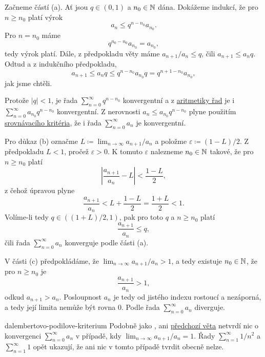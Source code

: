 \begin{thmproof}
 Začneme částí (a). Ať jsou $q \in (0,1)$ a $n_0 \in \mathbb{N}$ dána. Dokážeme indukcí,
 že pro $n \geq n_0$ platí výrok
 \[
  a_n \leq q^{n-n_0}a_{n_0}.
 \]
 Pro $n = n_0$ máme
 \[
  q^{n_0 - n_0}a_{n_0} = a_{n_0},
 \]
 tedy výrok platí. Dále, z předpokladu věty máme $a_{n+1} / a_n \leq q$, čili
 $a_{n+1} \leq a_nq$. Odtud a z indukčního předpokladu,
 \[
  a_{n+1} \leq a_n q \leq q^{n-n_0}a_{n_0}q = q^{n+1-n_0}a_{n_0},
 \]
 jak jsme chtěli.

 Protože $|q|<1$, je řada $\sum_{n = 0}^{\infty} q^{n-n_0}$ konvergentní a z
 \hyperref[prop:aritmetika-ciselnych-rad]{aritmetiky řad} je i $\sum_{n =
 0}^{\infty} a_{n_0}q^{n-n_0}$ konvergentní. Z nerovnosti $a_n \leq
 a_{n_0}q^{n-n_0}$ plyne použitím
 \hyperref[prop:srovnavaci-kriterium]{srovnávacího kritéria}, že i řada $\sum_{n
 = 0}^{\infty} a_n$ je konvergentní.

 Pro důkaz (b) označme $L \coloneqq \lim_{n \to \infty} a_{n+1} / a_n$ a položme
 $\varepsilon \coloneqq (1-L) / 2$. Z předpokladu $L < 1$, pročež
 $\varepsilon>0$. K tomuto $\varepsilon$ nalezneme $n_0 \in \mathbb{N}$ takové, že pro
 $n \geq n_0$ platí
 \[
  \left| \frac{a_{n+1}}{a_n} - L\right| < \frac{1-L}{2},
 \]
 z čehož úpravou plyne
 \[
  \frac{a_{n+1}}{a_n} < L + \frac{1-L}{2} = \frac{1+L}{2} < 1.
 \]
 Volíme-li tedy $q \in ((1+L) / 2,1)$, pak pro toto $q$ a $n \geq n_0$ platí
 \[
  \frac{a_{n+1}}{a_n} \leq q,
 \]
 čili řada $\sum_{n = 0}^{\infty} a_n$ konverguje podle části (a).

 V části (c) předpokládáme, že $\lim_{n \to \infty} a_{n+1} / a_n > 1$, a tedy
 existuje $n_0 \in \mathbb{N}$, že pro $n \geq n_0$ je
 \[
  \frac{a_{n+1}}{a_n} > 1,
 \]
 odkud $a_{n+1} > a_n$. Posloupnost $a_n$ je tedy od jistého indexu rostoucí a
 nezáporná, a tedy její limita nemůže být rovna $0$. Podle
  řada $\sum_{n =
 0}^{\infty} a_n$ diverguje.
\end{thmproof}

\begin{warning}{}{dalembertovo-podilove-kriterium}
 Podobně jako , ani
 \hyperref[thm:dalembertovo-podilove-kriterium]{předchozí věta} netvrdí nic o
 konvergenci $\sum_{n = 0}^{\infty} a_n$ v případě, kdy $\lim_{n \to \infty}
 a_{n+1} / a_n = 1$. Řady $\sum_{n = 1}^{\infty} 1 / n^2$ a $\sum_{n=1}^{\infty}
 1$ opět ukazují, že ani nic v tomto případě tvrdit obecně nelze.
\end{warning}

